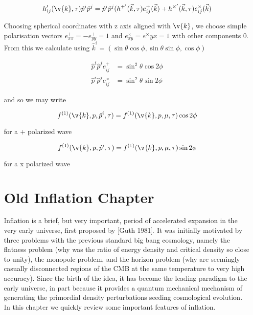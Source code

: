 \begin{equation}
h_{ij}'(\v{k},\tau)\hat{p}^i\hat{p}^j = \hat{p}^i\hat{p}^j (h^{+'}(\vec{k},\tau)e_{ij}^+(\vec{k}) + h^{\times'}(\vec{k},\tau)e_{ij}^\times(\vec{k})
\end{equation}

Choosing spherical coordinates with z axis aligned with $\v{k}$, we choose simple polarisation vectors $e^+_{xx}=-e^+_{yy}=1$ and $e^\times_{xy}=e^\times{yx}=1$ with other components 0. From this we calculate using $\hat{k}^i = (\sin\theta\cos\phi, \sin\theta\sin\phi, \cos\phi)$

\begin{equation}\begin{split}
\hat{p}^i\hat{p}^je_{ij}^+ &= \sin^2{\theta}\cos{2\phi} \\
\hat{p}^i\hat{p}^je_{ij}^\times &= \sin^2{\theta}\sin{2\phi}
\end{split}\end{equation}

and so we may write 

\begin{equation}
f^{(1)}(\v{k}, p, \hat{p}^i, \tau) = f^{(1)}(\v{k}, p, \mu, \tau)\cos{2\phi}
\end{equation}

for a + polarized wave


\begin{equation}
f^{(1)}(\v{k}, p, \hat{p}^i, \tau) = f^{(1)}(\v{k}, p, \mu, \tau)\sin{2\phi}
\end{equation}

for a x polarized wave


\section{Old Inflation Chapter}

Inflation is a brief, but very important, period of accelerated expansion in the very early universe, first proposed by [Guth 1981]. It was initially motivated by three problems with the previous standard big bang cosmology, namely the flatness problem (why was the ratio of energy density and critical density so close to unity), the monopole problem, and the horizon problem (why are seemingly casually disconnected regions of the CMB at the same temperature to very high accuracy). Since the birth of the idea, it has become the leading paradigm to the early universe, in part because it provides a quantum mechanical mechanism of generating the primordial density perturbations seeding cosmological evolution. In this chapter we quickly review some important features of inflation.

